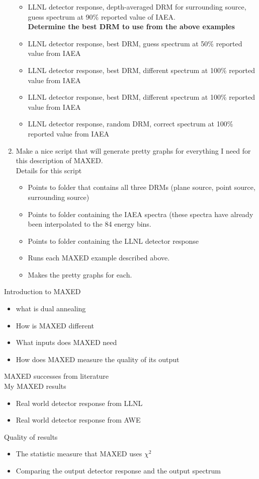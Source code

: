 \documentclass[11pt]{article}
\begin{document}
\begin{enumerate}
\begin{itemize}
	\item LLNL detector response, depth-averaged DRM for surrounding source, guess spectrum at 90\% reported value of IAEA.\\
	\textbf{Determine the best DRM to use from the above examples}
	\item LLNL detector response, best DRM, guess spectrum at 50\% reported value from IAEA
	\item LLNL detector response, best DRM, different spectrum at 100\% reported value from IAEA
	\item LLNL detector response, best DRM, different spectrum at 100\% reported value from IAEA
	\item LLNL detector response, random DRM, correct spectrum at 100\% reported value from IAEA
	
	\end{itemize}
\item Make a nice script that will generate pretty graphs for everything I need for this description of MAXED.\\
Details for this script
	\begin{itemize}
	\item Points to folder that contains all three DRMs (plane source, point source, surrounding source)
	\item Points to folder containing the IAEA spectra (these spectra have already been interpolated to the 84 energy bins.
	\item Points to folder containing the LLNL detector response
	\item Runs each MAXED example described above.
	\item Makes the pretty graphs for each.
	\end{itemize}

\end{enumerate}
\break


Introduction to MAXED
\begin{itemize}
   \item what is dual annealing
   \item How is MAXED different
   \item What inputs does MAXED need
   \item How does MAXED measure the quality of its output
\end{itemize}

MAXED successes from literature\\

My MAXED results
\begin{itemize}
\item Real world detector response from LLNL
\item Real world detector response from AWE
\end{itemize}

Quality of results
\begin{itemize}
\item The statistic measure that MAXED uses $\chi^2$
\item Comparing the output detector response and the output spectrum
\end{itemize}
   
   
\end{document}
